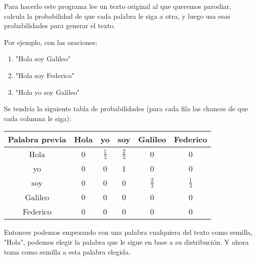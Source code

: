 \documentclass[../main.tex]{subfiles}
\begin{document}
Para hacerlo este programa lee un texto original al que queremos parodiar, calcula la probabilidad de que cada palabra le siga a otra, y luego usa esas probabilidades para generar el texto.

Por ejemplo, con las oraciones:
\begin{enumerate}
  \item "Hola soy Galileo"
  \item "Hola soy Federico"
  \item "Hola yo soy Galileo"
\end{enumerate}

Se tendría la siguiente tabla de probabilidades (para cada fila las chances de que cada columna le siga):
\begin{center}
\begin{tabular}{ c | c c c c c }
  Palabra previa & Hola & yo & soy & Galileo & Federico \\ \hline
  Hola & 0 & \(\frac{1}{3}\) & \(\frac{2}{3}\) & 0 & 0 \\
  yo & 0 & 0 & 1 & 0 & 0 \\
  soy & 0 & 0 & 0 & \(\frac{2}{3}\) & \(\frac{1}{3}\) \\
  Galileo & 0 & 0 & 0 & 0 & 0 \\
  Federico & 0 & 0 & 0 & 0 & 0 \\
\end{tabular}
\end{center}

Entonces podemos empezando con una palabra cualquiera del texto como semilla, "Hola", podemos elegir la palabra que le sigue en base a su distribución. Y ahora toma como semilla a esta palabra elegida.
\end{document}
